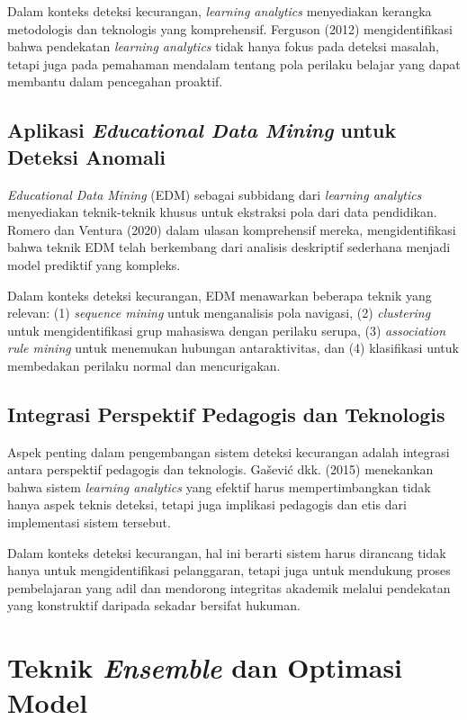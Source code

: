 Dalam konteks deteksi kecurangan, \textit{learning analytics} menyediakan kerangka metodologis dan teknologis yang komprehensif. Ferguson (2012) mengidentifikasi bahwa pendekatan \textit{learning analytics} tidak hanya fokus pada deteksi masalah, tetapi juga pada pemahaman mendalam tentang pola perilaku belajar yang dapat membantu dalam pencegahan proaktif.

\subsection{Aplikasi \textit{Educational Data Mining} untuk Deteksi Anomali}

\textit{Educational Data Mining} (EDM) sebagai subbidang dari \textit{learning analytics} menyediakan teknik-teknik khusus untuk ekstraksi pola dari data pendidikan. Romero dan Ventura (2020) dalam ulasan komprehensif mereka, mengidentifikasi bahwa teknik EDM telah berkembang dari analisis deskriptif sederhana menjadi model prediktif yang kompleks.

Dalam konteks deteksi kecurangan, EDM menawarkan beberapa teknik yang relevan: (1) \textit{sequence mining} untuk menganalisis pola navigasi, (2) \textit{clustering} untuk mengidentifikasi grup mahasiswa dengan perilaku serupa, (3) \textit{association rule mining} untuk menemukan hubungan antaraktivitas, dan (4) klasifikasi untuk membedakan perilaku normal dan mencurigakan.

\subsection{Integrasi Perspektif Pedagogis dan Teknologis}

Aspek penting dalam pengembangan sistem deteksi kecurangan adalah integrasi antara perspektif pedagogis dan teknologis. Ga\v{s}evi\'{c} dkk. (2015) menekankan bahwa sistem \textit{learning analytics} yang efektif harus mempertimbangkan tidak hanya aspek teknis deteksi, tetapi juga implikasi pedagogis dan etis dari implementasi sistem tersebut.

Dalam konteks deteksi kecurangan, hal ini berarti sistem harus dirancang tidak hanya untuk mengidentifikasi pelanggaran, tetapi juga untuk mendukung proses pembelajaran yang adil dan mendorong integritas akademik melalui pendekatan yang konstruktif daripada sekadar bersifat hukuman.

\section{Teknik \textit{Ensemble} dan Optimasi Model}
\label{sec:ensembleTechniques}

